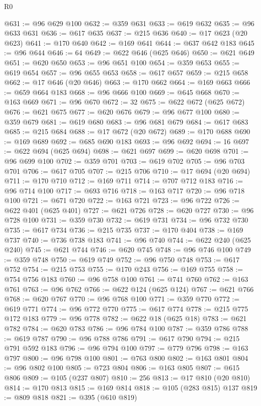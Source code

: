 \begin{lexlean}{R0}
\begin{coremodule}
@631 := @96 @629 @100
@632 := @359 @631
@633 := @619 @632
@635 := @96 @633 @631
@636 := @617 @635
@637 := @215 @636
@640 := @17 @623 (@20 @623)
@641 := @170 @640
@642 := @169 @641
@644 := @637 @642 @183
@645 := @96 @644
@646 := 64
@649 := @622 @646 (@625 @646)
@650 := @621 @649
@651 := @620 @650
@653 := @96 @651 @100
@654 := @359 @653
@655 := @619 @654
@657 := @96 @655 @653
@658 := @617 @657
@659 := @215 @658
@662 := @17 @646 (@20 @646)
@663 := @170 @662
@664 := @169 @663
@666 := @659 @664 @183
@668 := @96 @666 @100
@669 := @645 @668
@670 := @163 @669
@671 := @96 @670
@672 := 32
@675 := @622 @672 (@625 @672)
@676 := @621 @675
@677 := @620 @676
@679 := @96 @677 @100
@680 := @359 @679
@681 := @619 @680
@683 := @96 @681 @679
@684 := @617 @683
@685 := @215 @684
@688 := @17 @672 (@20 @672)
@689 := @170 @688
@690 := @169 @689
@692 := @685 @690 @183
@693 := @96 @692
@694 := 16
@697 := @622 @694 (@625 @694)
@698 := @621 @697
@699 := @620 @698
@701 := @96 @699 @100
@702 := @359 @701
@703 := @619 @702
@705 := @96 @703 @701
@706 := @617 @705
@707 := @215 @706
@710 := @17 @694 (@20 @694)
@711 := @170 @710
@712 := @169 @711
@714 := @707 @712 @183
@716 := @96 @714 @100
@717 := @693 @716
@718 := @163 @717
@720 := @96 @718 @100
@721 := @671 @720
@722 := @163 @721
@723 := @96 @722
@726 := @622 @401 (@625 @401)
@727 := @621 @726
@728 := @620 @727
@730 := @96 @728 @100
@731 := @359 @730
@732 := @619 @731
@734 := @96 @732 @730
@735 := @617 @734
@736 := @215 @735
@737 := @170 @404
@738 := @169 @737
@740 := @736 @738 @183
@741 := @96 @740
@744 := @622 @240 (@625 @240)
@745 := @621 @744
@746 := @620 @745
@748 := @96 @746 @100
@749 := @359 @748
@750 := @619 @749
@752 := @96 @750 @748
@753 := @617 @752
@754 := @215 @753
@755 := @170 @243
@756 := @169 @755
@758 := @754 @756 @183
@760 := @96 @758 @100
@761 := @741 @760
@762 := @163 @761
@763 := @96 @762
@766 := @622 @124 (@625 @124)
@767 := @621 @766
@768 := @620 @767
@770 := @96 @768 @100
@771 := @359 @770
@772 := @619 @771
@774 := @96 @772 @770
@775 := @617 @774
@778 := @215 @775 @172 @183
@779 := @96 @778
@782 := @622 @18 (@625 @18)
@783 := @621 @782
@784 := @620 @783
@786 := @96 @784 @100
@787 := @359 @786
@788 := @619 @787
@790 := @96 @788 @786
@791 := @617 @790
@794 := @215 @791 @592 @183
@796 := @96 @794 @100
@797 := @779 @796
@798 := @163 @797
@800 := @96 @798 @100
@801 := @763 @800
@802 := @163 @801
@804 := @96 @802 @100
@805 := @723 @804
@806 := @163 @805
@807 := @615 @806
@809 := @105 (@237 @807)
@810 := 256
@813 := @17 @810 (@20 @810)
@814 := @170 @813
@815 := @169 @814
@818 := @105 (@283 @815) @137
@819 := @809 @818
@821 := @395 (@610 @819)

\end{coremodule}
\end{lexlean}
